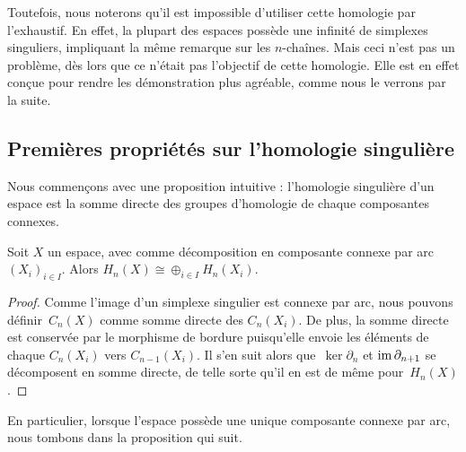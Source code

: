 Toutefois, nous noterons qu'il est impossible d'utiliser cette homologie par l'exhaustif. En effet, la plupart des espaces possède une infinité de simplexes singuliers, impliquant la même remarque sur les $n$-chaînes. Mais ceci n'est pas un problème, dès lors que ce n'était pas l'objectif de cette homologie. Elle est en effet conçue pour rendre les démonstration plus agréable, comme nous le verrons par la suite.

\subsection{Premières propriétés sur l'homologie singulière}

Nous commençons avec une proposition intuitive : l'homologie singulière d'un espace est la somme directe des groupes d'homologie de chaque composantes connexes.

\begin{proposition}
Soit $X$ un espace, avec comme décomposition en composante connexe par arc~$(X_i)_{i\in I}$. Alors $H_n(X)\cong\oplus_{i\in I} H_n(X_i)$.
\end{proposition}
\begin{proof}
Comme l'image d'un simplexe singulier est connexe par arc,  nous pouvons définir~$C_n(X)$ comme somme directe des $C_n(X_i)$. De plus, la somme directe est conservée par le morphisme de bordure puisqu'elle envoie les éléments de chaque $C_n(X_i)$ vers $C_{n-1}(X_{i})$. Il s'en suit alors que~$\ker\partial_n$ et $\mathrm{im}\,\partial_{n+1}$ se décomposent en somme directe, de telle sorte qu'il en est de même pour~$H_n(X)$.
\end{proof}

En particulier, lorsque l'espace possède une unique composante connexe par arc, nous tombons dans la proposition qui suit. 

